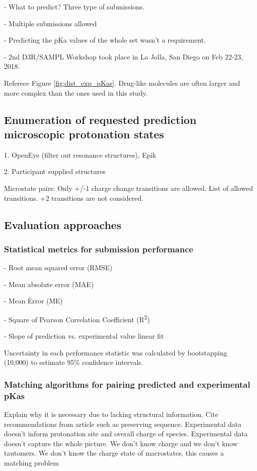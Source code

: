 \documentclass[9pt,lineno,final]{elife}
\begin{document}
- What to predict? Three type of submissions.

- Multiple submissions allowed

- Predicting the pKa values of the whole set wasn't a requirement. 

- 2nd D3R/SAMPL Workshop took place in La Jolla, San Diego on Feb 22-23, 2018.

Referece Figure \ref{fig:dist_exp_pKas}. Drug-like molecules are often larger and more complex than the ones used in this study.


\subsection{Enumeration of requested prediction microscopic protonation states}
1. OpenEye (filter out resonance structures), Epik  

2. Participant supplied structures  

Microstate pairs: Only +/-1 charge change transitions are allowed.
List of allowed transitions. +2 transitions are not considered.


\subsection{Evaluation approaches}

\subsubsection{Statistical metrics for submission performance}

- Root mean squared error (RMSE)

- Mean absolute error (MAE)

- Mean Error (ME)

- Square of Pearson Correlation Coefficient (R\textsuperscript{2})

- Slope of prediction vs. experimental value linear fit

Uncertainty in each performance statistic was calculated by bootstapping (10,000) to estimate 95\% confidence intervals.

\subsubsection{Matching algorithms for pairing predicted and experimental pKas}

Explain why it is necessary due to lacking structural information. Cite recommendations from article such as preserving sequence.
Experimental data doesn't inform protonation site and overall charge of species.
 Experimental data doesn't capture the whole picture. We don't know charge and we don't know tautomers.
 We don't know the charge state of macrostates, this causes a matching problem
\end{document}

